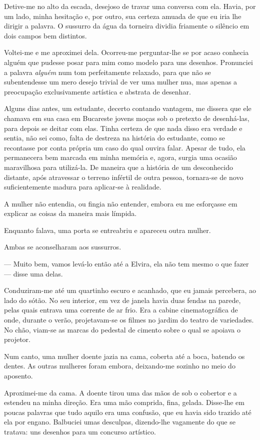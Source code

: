 Detive-me no alto da escada, desejoso de travar uma conversa com ela. Havia, por um lado, minha hesitação e, por outro, sua certeza amuada de que eu iria lhe dirigir a palavra. O sussurro da água da torneira dividia friamente o silêncio em dois campos bem distintos.

Voltei-me e me aproximei dela. Ocorreu-me perguntar-lhe se por acaso conhecia alguém que pudesse posar para mim como modelo para uns desenhos. Pronunciei a palavra \textit{alguém} num tom perfeitamente relaxado, para que não se subentendesse um mero desejo trivial de ver uma mulher nua, mas apenas a preocupação exclusivamente artística e abstrata de desenhar.

Alguns dias antes, um estudante, decerto contando vantagem, me dissera que ele chamava em sua casa em Bucareste jovens moças sob o pretexto de desenhá-las, para depois se deitar com elas. Tinha certeza de que nada disso era verdade e sentia, não sei como, falta de destreza na história do estudante, como se recontasse por conta própria um caso do qual ouvira falar. Apesar de tudo, ela permanecera bem marcada em minha memória e, agora, surgia uma ocasião maravilhosa para utilizá-la. De maneira que a história de um desconhecido distante, após atravessar o terreno infértil de outra pessoa, tornara-se de novo suficientemente madura para aplicar-se à realidade.

A mulher não entendia, ou fingia não entender, embora eu me esforçasse em explicar as coisas da maneira mais límpida.

Enquanto falava, uma porta se entreabriu e apareceu outra mulher.

Ambas se aconselharam aos sussurros.

--- Muito bem, vamos levá-lo então até a Elvira, ela não tem mesmo o que fazer --- disse uma delas.

Conduziram-me até um quartinho escuro e acanhado, que eu jamais percebera, ao lado do sótão. No seu interior, em vez de janela havia duas fendas na parede, pelas quais entrava uma corrente de ar frio. Era a cabine cinematográfica de onde, durante o verão, projetavam-se os filmes no jardim do teatro de variedades. No chão, viam-se as marcas do pedestal de cimento sobre o qual se apoiava o projetor.

Num canto, uma mulher doente jazia na cama, coberta até a boca, batendo os dentes. As outras mulheres foram embora, deixando-me sozinho no meio do aposento.

Aproximei-me da cama. A doente tirou uma das mãos de sob o cobertor e a estendeu na minha direção. Era uma mão comprida, fina, gelada. Disse-lhe em poucas palavras que tudo aquilo era uma confusão, que eu havia sido trazido até ela por engano. Balbuciei umas desculpas, dizendo-lhe vagamente do que se tratava: uns desenhos para um concurso artístico.

